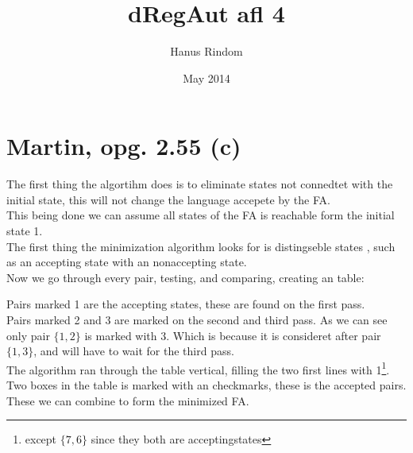 \documentclass{article}
\title{dRegAut afl 4}
\author{Hanus Rindom}
\date{May 2014}
\begin{document}
\maketitle

\section*{Martin, opg. 2.55 (c)}
The first thing the algortihm does is to eliminate states not connedtet with the initial state, this will not change the language accepete by the FA.\\
This being done we can assume all states of the FA is reachable form the initial state 1.\\
The first thing the minimization algorithm looks for is distingseble states , such as an accepting state with an nonaccepting state.\\

Now we go through every pair, testing, and comparing, creating an table:



Pairs marked 1 are the accepting states, these are found on the first pass.\\
Pairs marked 2 and 3 are marked on the second and third pass. As we can see only pair $ \{ 1,2 \} $ is marked with 3. Which is because it is consideret after pair $ \{ 1,3 \} $, and will have to wait for the third pass. \\
The algorithm ran through the table vertical, filling the two first lines with 1\footnote{except $ \{ 7,6 \} $ since they both are acceptingstates}.\\

Two boxes in the table is marked with an checkmarks, these is the accepted pairs. These we can combine to form the minimized FA.

\end{document}
